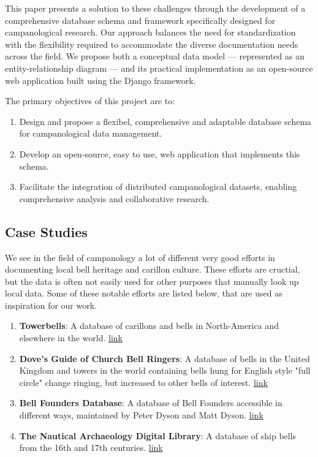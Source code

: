 \documentclass[11pt, a4paper]{article}
\begin{document}
This paper presents a solution to these challenges through the development of a comprehensive database schema and framework specifically designed for campanological research. Our approach balances the need for standardization with the flexibility required to accommodate the diverse documentation needs across the field. We propose both a conceptual data model — represented as an entity-relationship diagram — and its practical implementation as an open-source web application built using the Django framework.

The primary objectives of this project are to:
\begin{enumerate}
    \item Design and propose a flexibel, comprehensive and adaptable database schema for campanological data management.
    \item Develop an open-source, easy to use, web application that implements this schema.
    \item Facilitate the integration of distributed campanological datasets, enabling comprehensive analysis and collaborative research.
\end{enumerate}

\subsection{Case Studies}

We see in the field of campanology a lot of different very good efforts in documenting local bell heritage and carillon culture. These efforts are cructial, but the data is often not easily used for other purposes that manually look up local data. Some of these notable efforts are listed below, that are used as inspiration for our work.

\begin{enumerate}
    \item \textbf{Towerbells}: A database of carillons and bells in North-America and elsewhere in the world. \href{https://www.towerbells.org/}{link}
    \item \textbf{Dove's Guide of Church Bell Ringers}: A database of bells in the United Kingdom and towers in the world containing bells hung for English style "full circle" change ringing, but increased to other bells of interest. \href{https://dove.cccbr.org.uk/}{link}
    \item \textbf{Bell Founders Database}: A database of Bell Founders accessible in different ways, maintained by Peter Dyson and Matt Dyson. \href{https://www.bellfounders.net}{link}
    \item \textbf{The Nautical Archaeology Digital Library}: A database of ship bells from the 16th and 17th centuries. \href{https://shiplib.org/index.php/collections/artifact-collections/early-ship-bells-database/}{link} 
\end{enumerate}
\end{document}
